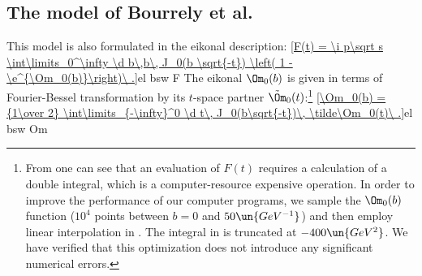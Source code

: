\subsection{The model of Bourrely et al.}

This model  is also formulated in the eikonal description:
\eqref{F(t) = \i p\sqrt s \int\limits_0^\infty \d b\,b\, J_0(b \sqrt{-t}) \left( 1 - \e^{\Om_0(b)}\right)\ .}{el bsw F}
The eikonal $\Om_0(b)$ is given in terms of Fourier-Bessel transformation by its $t$-space partner $\tilde\Om_0(t)$:\footnote{%
From  one can see that an evaluation of $F(t)$ requires a calculation of a double integral, which is a computer-resource expensive operation. In order to improve the performance of our computer programs, we sample the $\Om_0(b)$ function ($10^4$ points between $b=0$ and $50\un{GeV^{-1}}$) and then employ linear interpolation in . The integral in  is truncated at $-400\un{GeV^2}$. We have verified that this optimization does not introduce any significant numerical errors.
}
\eqref{\Om_0(b) = {1\over 2} \int\limits_{-\infty}^0 \d t\, J_0(b\sqrt{-t})\, \tilde\Om_0(t)\ .}{el bsw Om}

